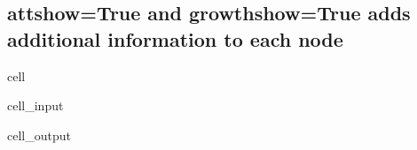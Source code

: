 \documentclass[letterpaper,10pt,english]{jupyterBook}
\begin{document}
\subsection{attshow=True and growthshow=True adds additional information to each node}
\label{\detokenize{content/06_ModelAnalytics/ModelStructure:attshow-true-and-growthshow-true-adds-additional-information-to-each-node}}
\begin{sphinxuseclass}{cell}\begin{sphinxVerbatimInput}

\begin{sphinxuseclass}{cell_input}
\begin{sphinxVerbatim}[commandchars=\\\{\}]
 
                                       
                                   
\end{sphinxVerbatim}

\end{sphinxuseclass}\end{sphinxVerbatimInput}
\begin{sphinxVerbatimOutput}

\begin{sphinxuseclass}{cell_output}
\noindent{}

\end{sphinxuseclass}\end{sphinxVerbatimOutput}

\end{sphinxuseclass}
\end{document}
